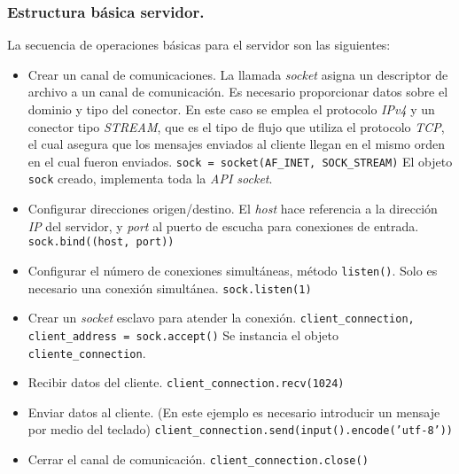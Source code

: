 \subsubsection{Estructura básica servidor.}
La secuencia de operaciones básicas para el servidor son las siguientes:
\begin{itemize}
\item Crear un canal de comunicaciones. La llamada \emph{socket} asigna un descriptor de archivo a un canal de comunicación. Es necesario proporcionar datos sobre el dominio y tipo del conector. En este caso se emplea el protocolo \emph{IPv4} y un conector tipo \emph{STREAM}, que es el tipo de flujo que utiliza el protocolo \emph{TCP}, el cual asegura que los mensajes enviados al cliente llegan en el mismo orden en el cual fueron enviados.
\texttt{sock = socket(AF\_INET, SOCK\_STREAM)}
El objeto \texttt{sock} creado, implementa toda la \emph{API socket}.

\item Configurar direcciones origen/destino. El \emph{host} hace referencia a la dirección \emph{IP} del servidor, y \emph{port} al puerto de escucha para conexiones de entrada.
\texttt{sock.bind((host, port))}

\item Configurar el número de conexiones simultáneas, método \texttt{listen()}.
Solo es necesario una conexión simultánea.
\texttt{sock.listen(1)}

\item Crear un \emph{socket} esclavo para atender la conexión.
\texttt{client\_connection, client\_address = sock.accept()}
Se instancia el objeto \texttt{cliente\_connection}.

\item Recibir datos del cliente.
\texttt{client\_connection.recv(1024)}

\item Enviar datos al cliente.
(En este ejemplo es necesario introducir un mensaje por medio del teclado)
\texttt{client\_connection.send(input().encode('utf-8'))}

\item Cerrar el canal de comunicación.
\texttt{client\_connection.close()}
\end{itemize}


